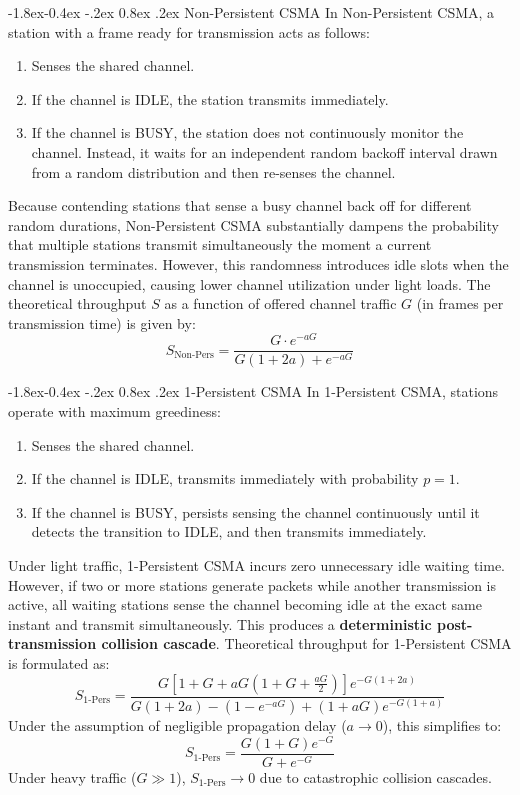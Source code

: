 \documentclass[11pt,a4paper]{article}
\makeatletter
\renewcommand\subsection{\@startsection{subsection}{2}{\z@}%
                                     {-1.8ex\@plus -0.4ex \@minus -.2ex}%
                                     {0.8ex \@plus .2ex}%
                                     {\normalfont\large\bfseries}}
\makeatother
\begin{document}
\subsection{Non-Persistent CSMA}
In Non-Persistent CSMA, a station with a frame ready for transmission acts as follows:
\begin{enumerate}
    \item Senses the shared channel.
    \item If the channel is IDLE, the station transmits immediately.
    \item If the channel is BUSY, the station does not continuously monitor the channel. Instead, it waits for an independent random backoff interval drawn from a random distribution and then re-senses the channel.
\end{enumerate}
Because contending stations that sense a busy channel back off for different random durations, Non-Persistent CSMA substantially dampens the probability that multiple stations transmit simultaneously the moment a current transmission terminates. However, this randomness introduces idle slots when the channel is unoccupied, causing lower channel utilization under light loads. The theoretical throughput $S$ as a function of offered channel traffic $G$ (in frames per transmission time) is given by:
\begin{equation}
    S_{\text{Non-Pers}} = \frac{G \cdot e^{-a G}}{G(1 + 2a) + e^{-a G}}
\end{equation}

\subsection{1-Persistent CSMA}
In 1-Persistent CSMA, stations operate with maximum greediness:
\begin{enumerate}
    \item Senses the shared channel.
    \item If the channel is IDLE, transmits immediately with probability $p = 1$.
    \item If the channel is BUSY, persists sensing the channel continuously until it detects the transition to IDLE, and then transmits immediately.
\end{enumerate}
Under light traffic, 1-Persistent CSMA incurs zero unnecessary idle waiting time. However, if two or more stations generate packets while another transmission is active, all waiting stations sense the channel becoming idle at the exact same instant and transmit simultaneously. This produces a \textbf{deterministic post-transmission collision cascade}. Theoretical throughput for 1-Persistent CSMA is formulated as:
\begin{equation}
    S_{\text{1-Pers}} = \frac{G [1 + G + a G (1 + G + \frac{a G}{2})] e^{-G(1+2a)}}{G(1 + 2a) - (1 - e^{-a G}) + (1 + a G) e^{-G(1+a)}}
\end{equation}
Under the assumption of negligible propagation delay ($a \to 0$), this simplifies to:
\begin{equation}
    S_{\text{1-Pers}} = \frac{G (1 + G) e^{-G}}{G + e^{-G}}
\end{equation}
Under heavy traffic ($G \gg 1$), $S_{\text{1-Pers}} \to 0$ due to catastrophic collision cascades.
\end{document}
